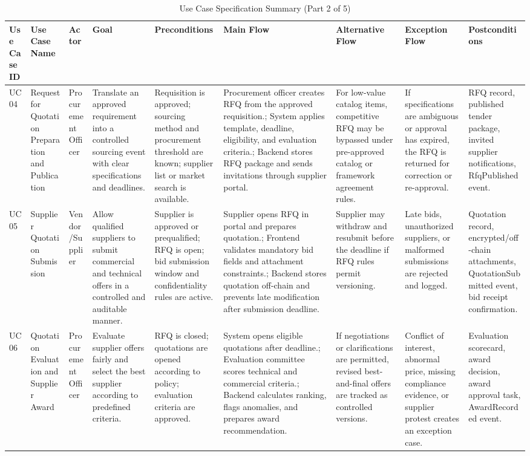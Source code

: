 \documentclass[conference]{IEEEtran}
\begin{document}
\begin{table}[!t]
\caption{Use Case Specification Summary (Part 2 of 5)}
\label{tab:usecases-2}
\tiny
\begin{tabularx}{\textwidth}{|L{0.75cm}|L{1.8cm}|L{1.6cm}|Y|Y|Y|Y|Y|Y|}
\hline
\textbf{Use Case ID} & \textbf{Use Case Name} & \textbf{Actor} & \textbf{Goal} & \textbf{Preconditions} & \textbf{Main Flow} & \textbf{Alternative Flow} & \textbf{Exception Flow} & \textbf{Postconditions} \\ \hline
UC04 & Request for Quotation Preparation and Publication & Procurement Officer & Translate an approved requirement into a controlled sourcing event with clear specifications and deadlines. & Requisition is approved; sourcing method and procurement threshold are known; supplier list or market search is available. & Procurement officer creates RFQ from the approved requisition.; System applies template, deadline, eligibility, and evaluation criteria.; Backend stores RFQ package and sends invitations through supplier portal. & For low-value catalog items, competitive RFQ may be bypassed under pre-approved catalog or framework agreement rules. & If specifications are ambiguous or approval has expired, the RFQ is returned for correction or re-approval. & RFQ record, published tender package, invited supplier notifications, RfqPublished event. \\ \hline
UC05 & Supplier Quotation Submission & Vendor/Supplier & Allow qualified suppliers to submit commercial and technical offers in a controlled and auditable manner. & Supplier is approved or prequalified; RFQ is open; bid submission window and confidentiality rules are active. & Supplier opens RFQ in portal and prepares quotation.; Frontend validates mandatory bid fields and attachment constraints.; Backend stores quotation off-chain and prevents late modification after submission deadline. & Supplier may withdraw and resubmit before the deadline if RFQ rules permit versioning. & Late bids, unauthorized suppliers, or malformed submissions are rejected and logged. & Quotation record, encrypted/off-chain attachments, QuotationSubmitted event, bid receipt confirmation. \\ \hline
UC06 & Quotation Evaluation and Supplier Award & Procurement Officer & Evaluate supplier offers fairly and select the best supplier according to predefined criteria. & RFQ is closed; quotations are opened according to policy; evaluation criteria are approved. & System opens eligible quotations after deadline.; Evaluation committee scores technical and commercial criteria.; Backend calculates ranking, flags anomalies, and prepares award recommendation. & If negotiations or clarifications are permitted, revised best-and-final offers are tracked as controlled versions. & Conflict of interest, abnormal price, missing compliance evidence, or supplier protest creates an exception case. & Evaluation scorecard, award decision, award approval task, AwardRecorded event. \\ \hline
\end{tabularx}
\end{table}
\end{document}
